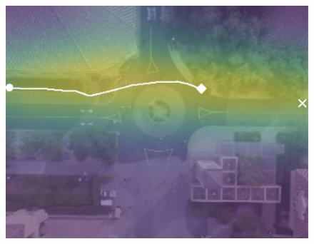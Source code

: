 \documentclass[letterpaper,10pt,conference]{ieeeconf}
\begin{document}
\begin{figure}
\begin{minipage}[c]{0.3\linewidth}
		\includegraphics[width=\linewidth]{./figures/comparison/ours_death_1_2_t=370.jpg}
	\end{minipage}
	

\end{figure}
\end{document}
